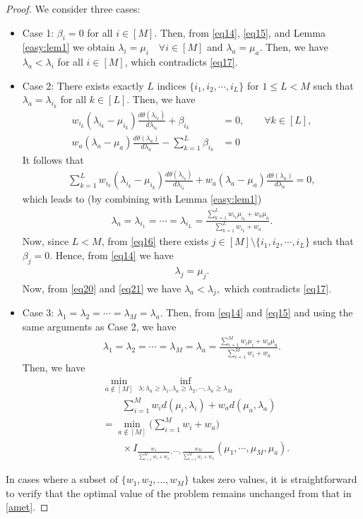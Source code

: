\documentclass[final]{IEEEtran}
\newcommand{\nn}{\nonumber}
\begin{document}
\begin{proof}
We consider three cases:
\begin{itemize}
\item Case 1:  $\beta_i=0$ for all $i \in [M]$. Then, from \eqref{eq14}, \eqref{eq15}, and Lemma \ref{easy:lem1} we obtain $\lambda_i=\mu_i \quad \forall  i \in [M]$ and $\lambda_a=\mu_a$.  Then, we have $\lambda_a <\lambda_i$ for all $i \in [M]$, which contradicts \eqref{eq17}. 
\item Case 2: There exists exactly $L$ indices $\{i_1,i_2,\cdots, i_L\}$ for $1\leq L<M$ such that $\lambda_a=\lambda_{i_k}$ for all $k \in [L]$.  Then, we have
\begin{align}
w_{i_k} (\lambda_{i_k}-\mu_{i_k})\frac{d\theta(\lambda_{i_k})}{d\lambda_{i_k}}+\beta_{i_k}&=0,\qquad \forall k \in [L],\\
w_a (\lambda_a-\mu_a)\frac{d\theta(\lambda_a)}{d\lambda_a}-\sum_{k=1}^L \beta_{i_k}&=0
\end{align}
It follows that
\begin{align}
\sum_{k=1}^L w_{i_k} (\lambda_{i_k}-\mu_{i_k})\frac{d\theta(\lambda_{i_k})}{d\lambda_{i_k}}+w_a (\lambda_a-\mu_a)\frac{d\theta(\lambda_a)}{d\lambda_a}=0,
\end{align} which leads to (by combining with Lemma \ref{easy:lem1})
\begin{align}
\lambda_a=\lambda_{i_1}=\cdots =\lambda_{i_L}=\frac{\sum_{k=1}^L w_{i_k} \mu_{i_k}+ w_a \mu_a}{\sum_{k=1}^L w_{i_k}+w_a} \label{eq20}.
\end{align}
Now, since $L<M$, from \eqref{eq16} there exists $j \in [M]\setminus \{i_1,i_2,\cdots, i_L\}$ such that $\beta_j=0$. Hence, from \eqref{eq14} we have
\begin{align}
\lambda_j=\mu_j \label{eq21}.
\end{align}
Now, from \eqref{eq20} and \eqref{eq21} we have
$
\lambda_a< \lambda_j,
$ which contradicts \eqref{eq17}. 
\item Case 3: $\lambda_1=\lambda_2=\cdots =\lambda_M=\lambda_a$. Then, from \eqref{eq14} and \eqref{eq15} and using the same arguments as Case 2, we have
\begin{align}
\lambda_1=\lambda_2=\cdots =\lambda_M=\lambda_a=\frac{\sum_{i=1}^M w_i \mu_i+ w_a \mu_a}{\sum_{i=1}^M w_i+w_a}. 
\end{align}
Then, we have
\begin{align}
&\min_{a \notin [M]} \inf_{\lambda: \lambda_a\geq \lambda_1, \lambda_a \geq \lambda_2, \cdots, \lambda_a \geq \lambda_M} 
\nn\\
&\qquad \sum_{i=1}^M w_i d(\mu_i,\lambda_i)+ w_a d(\mu_a,\lambda_a)\nn\\
&=\min_{a \notin [M]} \bigg(\sum_{i=1}^M w_i+w_a\bigg)\nn\\
&\qquad \times I_{\frac{w_1}{\sum_{i=1}^M w_i+w_a},  \cdots, \frac{w_M}{\sum_{i=1}^M w_i+w_a}}(\mu_1,\cdots, \mu_M,\mu_a) \label{amet}.
\end{align}
\end{itemize}
In cases where a subset of $\{w_1, w_2, \ldots, w_M\}$ takes zero values, it is straightforward to verify that the optimal value of the problem remains unchanged from that in \eqref{amet}.


\end{proof}
\end{document}
